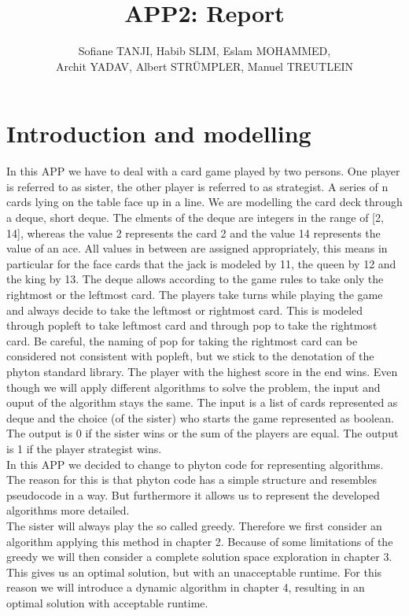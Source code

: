 \documentclass[parskip=full]{scrartcl}
\title{APP2: Report}
\author{Sofiane TANJI, Habib SLIM, Eslam MOHAMMED,\\ Archit YADAV, Albert STRÜMPLER, Manuel TREUTLEIN}
\begin{document}
\maketitle

\section{Introduction and modelling}
In this APP we have to deal with a card game played by two persons.
One player is referred to as sister, the other player is referred to as strategist.
A series of n cards lying on the table face up in a line. We are modelling
the card deck through a \gls{deque}, short deque. The elments of the deque are integers
in the range of [2, 14], whereas the value 2 represents the card 2 and the
value 14 represents the value of an ace. All values in between are assigned
appropriately, this means in particular for the face cards that the jack
is modeled by 11, the queen by 12 and the king by 13.
The deque allows according to the game rules to take only the
rightmost or the leftmost card. The players take turns while playing the
game and always decide to take the leftmost or rightmost card. This is
modeled through \gls{popleft} to take leftmost card and through \gls{pop}
to take the rightmost card. Be careful, the naming of \gls{pop} for taking
the rightmost card can be considered not consistent with \gls{popleft}, but we
stick to the denotation of the phyton standard library. The player with
the highest score in the end wins. Even though we will apply different
algorithms to solve the problem, the input and ouput of the algorithm stays the same.
The input is a list of cards represented as deque and the choice (of the sister)
who starts the game represented as boolean. The output is 0 if the sister wins
or the sum of the players are equal. The output is 1 if the
player strategist wins.\\

In this APP we decided to change to phyton code for representing algorithms.
The reason for this is that phyton code has a simple structure and resembles
pseudocode in a way. But furthermore it allows us to represent the developed
algorithms more detailed.\\

The sister will always play the so called \gls{greedy}. Therefore we first consider
an algorithm applying this method in chapter 2. Because of some limitations
of the \gls{greedy} we will then consider a complete solution space exploration
in chapter 3. This gives us an optimal solution, but with an unacceptable runtime.
For this reason we will introduce a dynamic algorithm in chapter 4, resulting
in an optimal solution with acceptable runtime.
\end{document}
